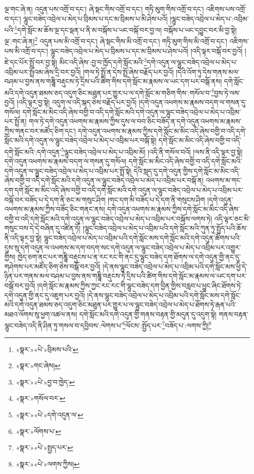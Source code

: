 ལྔ་གང་ཞེ་ན། འདུན་པས་འགྲོ་བ་དང་། ཞེ་སྡང་གིས་འགྲོ་བ་དང་། གཏི་མུག་གིས་འགྲོ་བ་དང་། འཇིགས་པས་འགྲོ་བ་དང་། ལྷུང་བཟེད་འབྲེལ་པ་མེད་པ་བྲིམས་པ་དང་མ་བྲིམས་པ་མི་ཤེས་པའོ། །ལྷུང་བཟེད་འབྲེལ་པ་མེད་པ་:འབྲིམ་པའི་\footnote{«སྣར་»«པེ་»བྲིམས་པའི་}དགེ་སློང་མ་ཆོས་ལྔ་དང་ལྡན་པ་ནི་མ་བསྐོས་པ་ཡང་བསྐོ་བར་བྱ་ལ། བསྐོས་པ་ཡང་དབྱུང་བར་མི་བྱ་སྟེ། ལྔ་:གང་ཞེ་ན།\footnote{«སྣར་»གང་ཞེས།} འདུན་པས་མི་འགྲོ་བ་དང་། ཞེ་སྡང་གིས་མི་འགྲོ་བ་དང་། གཏི་མུག་གིས་མི་འགྲོ་བ་དང་། འཇིགས་པས་མི་འགྲོ་བ་དང་། ལྷུང་བཟེད་འབྲེལ་པ་མེད་པ་བྲིམས་པ་དང་མ་བྲིམས་པ་ཤེས་པའོ། །འདི་ལྟར་བསྐོ་བར་བྱའོ། །ཇེ་དང་པོར་སྤྲོ་བར་བྱ་སྟེ། མིང་འདི་ཞེས་:བྱ་བ་ཁྱོད་དགེ་སློང་མའི་\footnote{«སྣར་»«པེ་»བྱ་བ་ཁྱེད་}དགེ་འདུན་ལ་ལྷུང་བཟེད་འབྲེལ་པ་མེད་པ་འབྲིམ་པར་སྤྲོའམ་ཞེས་དྲི་བར་བྱའོ། །གལ་ཏེ་སྤྲོ་ན་དེས་སྤྲོ་ཞེས་བརྗོད་པར་བྱའོ། །དེའི་འོག་ཏུ་དེས་གནས་མལ་བཤམ་པ་བྱས་ནས་གཎྜཱི་བརྡུངས་ཏེ་དྲིས་པའི་ཚིག་གིས་དགེ་སློང་མ་རྣམས་ལ་ཡང་དག་པར་བསྒོ་ནས། དགེ་སློང་མའི་དགེ་འདུན་ཐམས་ཅད་འདུག་ཅིང་མཐུན་པར་གྱུར་པ་ལ་དགེ་སློང་མ་གཅིག་གིས་:གསོལ་བ་\footnote{«སྣར་»གསོལ་བར་}བྱས་ཏེ་ལས་བྱའོ། །འདི་ལྟར་བྱ་སྟེ། འདུག་ལ་འདི་སྐད་ཅེས་བརྗོད་པར་བྱའོ། །དགེ་འདུན་འཕགས་མ་རྣམས་བདག་ལ་གསན་དུ་གསོལ། དགེ་སློང་མ་མིང་འདི་ཞེས་བགྱི་བ་འདི་དགེ་སློང་མའི་དགེ་འདུན་ལ་ལྷུང་བཟེད་འབྲེལ་པ་མེད་པ་འབྲིམ་པར་སྤྲོ་ན། གལ་ཏེ་དགེ་འདུན་འཕགས་མ་རྣམས་ཀྱིས་དུས་ལ་བབ་ཅིང་བཟོད་ན་དགེ་འདུན་འཕགས་མ་རྣམས་ཀྱིས་གནང་བར་མཛོད་ཅིག་དང་། དགེ་འདུན་འཕགས་མ་རྣམས་ཀྱིས་དགེ་སློང་མ་མིང་འདི་ཞེས་བགྱི་བ་འདི་དགེ་སློང་མའི་དགེ་འདུན་ལ་ལྷུང་བཟེད་འབྲེལ་པ་མེད་པ་འབྲིམ་པར་བསྐོ་སྟེ། དགེ་སློང་མ་མིང་འདི་ཞེས་བགྱི་བ་འདི་དགེ་སློང་མའི་:དགེ་འདུན་\footnote{«སྣར་»«པེ་»དགེ་འདུན་ལ་}ལྷུང་བཟེད་འབྲེལ་པ་མེད་པ་འབྲིམ་མོ། །འདི་ནི་གསོལ་བའོ། །ལས་ནི་འདི་ལྟར་བྱ་སྟེ། དགེ་འདུན་འཕགས་མ་རྣམས་བདག་ལ་གསན་དུ་གསོལ། དགེ་སློང་མ་མིང་འདི་ཞེས་བགྱི་བ་འདི་དགེ་སློང་མའི་དགེ་འདུན་ལ་ལྷུང་བཟེད་འབྲེལ་པ་མེད་པ་འབྲིམ་པར་སྤྲོ་སྟེ། དེའི་སླད་དུ་དགེ་འདུན་གྱིས་དགེ་སློང་མ་མིང་འདི་ཞེས་བགྱི་བ་འདི་དགེ་སློང་མའི་དགེ་འདུན་ལ་ལྷུང་བཟེད་འབྲེལ་པ་མེད་པ་འབྲིམ་པར་བསྐོ་ན། འཕགས་མ་གང་དག་དགེ་སློང་མ་མིང་འདི་ཞེས་བགྱི་བ་འདི་དགེ་སློང་མའི་དགེ་འདུན་ལ་ལྷུང་བཟེད་འབྲེལ་པ་མེད་པ་འབྲིམ་པར་བསྐོ་བར་བཟོད་པ་དེ་དག་ནི་ཅང་མ་གསུང་ཤིག །གང་དག་མི་བཟོད་པ་དེ་དག་ནི་གསུངས་ཤིག །དགེ་འདུན་འཕགས་མ་རྣམས་ཀྱིས་བཟོད་ཅིང་གནང་ནས། དགེ་འདུན་འཕགས་མ་རྣམས་ཀྱིས་དགེ་སློང་མ་མིང་འདི་ཞེས་བགྱི་བ་འདི་དགེ་སློང་མའི་དགེ་འདུན་ལ་ལྷུང་བཟེད་འབྲེལ་པ་མེད་པ་འབྲིམ་པར་བསྐོས་ལགས་ཏེ། འདི་ལྟར་ཅང་མི་གསུང་བས་དེ་དེ་བཞིན་དུ་འཛིན་ཏོ། །ལྷུང་བཟེད་འབྲེལ་པ་མེད་པ་འབྲིམ་པའི་དགེ་སློང་མའི་ཀུན་ཏུ་སྤྱོད་པའི་ཆོས་ནི་འདི་ལྟར་བྱ་སྟེ། ལྷུང་བཟེད་འབྲེལ་པ་མེད་པ་འབྲིམ་པའི་དགེ་སློང་མས་དགེ་སློང་མའི་དགེ་འདུན་ཚོགས་པའི་དུས་སུ་དགེ་འདུན་ལ་འཕགས་མ་དག་བདག་སང་དགེ་འདུན་ལ་ལྷུང་བཟེད་འབྲེལ་པ་མེད་པ་འབྲིམ་པར་འགྱུར་གྱིས། ཁྱེད་ཅག་ནང་པར་གཎྜཱི་བརྡུངས་པ་ན་རང་རང་གི་ནང་དུ་ལྷུང་བཟེད་དག་ཐོགས་ལ་དགེ་འདུན་གྱི་ནང་དུ་གཤེགས་པར་མཛོད་ཅིག་ཅེས་བསྒོ་བར་བྱའོ། །དེ་ནས་ལྷུང་བཟེད་འབྲེལ་པ་མེད་པ་འབྲིམ་པའི་དགེ་སློང་མས་ཕྱི་དེ་ཉིན་པར་གནས་མལ་བཤམ་པ་བྱས་ནས་གཎྜཱི་བརྡུངས་ཏེ་དྲིས་པའི་ཚིག་གིས་དགེ་སློང་མ་རྣམས་ལ་ཡང་དག་པར་བསྒོ་བར་བྱའོ། །དགེ་སློང་མ་རྣམས་ཀྱིས་ཀྱང་རང་རང་གི་ལྷུང་བཟེད་དག་བྱིན་གྱིས་བརླབ་པ་ཕྱུང་ཞིང་ཐོགས་ཏེ་དགེ་འདུན་གྱི་ནང་དུ་འཇུག་པར་བྱའོ། །དེ་ནས་ལྷུང་བཟེད་འབྲེལ་པ་མེད་པ་འབྲིམ་པའི་དགེ་སློང་མས་དགེ་སློང་མའི་དགེ་འདུན་ཐམས་ཅད་འདུག་ཅིང་མཐུན་པར་གྱུར་པ་ལ་ལྷུང་བཟེད་འབྲེལ་པ་མེད་པ་ཐོགས་ཏེ་རྒན་པའི་མཐའ་ལོགས་སུ་ཕྱག་འཚལ་ནས། དགེ་སློང་མའི་དགེ་འདུན་གྱི་གནས་བརྟན་གྱི་མདུན་དུ་འདུག་སྟེ། གནས་བརྟན་ལྷུང་བཟེད་འདི་ནི་ཤིན་ཏུ་གསལ་བ་དབྱིབས་:ལེགས་པ་\footnote{«སྣར་»ལོགས་པ་}ལོངས་:སྤྱོད་པར་\footnote{«སྣར་»«པེ་»སྤྱད་པར་}བཟོད་པ་:ལགས་ཀྱི།\footnote{«སྣར་»«པེ་»ལགས་ཀྱིས།} 